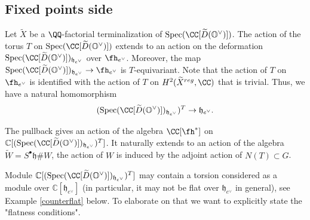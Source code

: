 \documentclass[12pt]{amsart}
\begin{document}





\subsection{Fixed points side}\label{fixed points subsection}
Let $\widetilde{X}$ be a $\QQ$-factorial terminalization of $\operatorname{Spec}(\CC[\widetilde{D}(\mathbb{O}^\vee)])$. The action of the torus $T$ on $\operatorname{Spec}(\CC[\widetilde{D}(\mathbb{O}^\vee)])$ extends to an action on the deformation $\operatorname{Spec}(\CC[\widetilde{D}(\mathbb{O}^\vee)])_{\mathfrak{h}_{e^\vee}}$ over $\fh_{e^\vee}$. Moreover, the map $\operatorname{Spec}(\CC[\widetilde{D}(\mathbb{O}^\vee)])_{\mathfrak{h}_{e^\vee}}\to \fh_{e^\vee}$ is $T$-equivariant. Note that the action of $T$ on $\fh_{e^\vee}$ is identified with the action of $T$ on $H^2(\widetilde{X}^{reg}, \CC)$ that is trivial. Thus, we have a natural homomorphism \begin{equation*}
(\operatorname{Spec}(\CC[\widetilde{D}(\mathbb{O}^\vee)])_{\mathfrak{h}_{e^\vee}})^{T} \rightarrow \mathfrak{h}_{e^\vee}.
\end{equation*}

The pullback gives an action of the algebra $\CC[\fh^*]$ on $\mathbb{C}[(\operatorname{Spec}(\CC[\widetilde{D}(\mathbb{O}^\vee)])_{\mathfrak{h}_{e^\vee}})^{T}]$. It naturally extends to an action of the algebra $\widetilde{W}=S^\bullet\mathfrak{h} \# W$, the action of $W$ is induced by the adjoint action of $N(T) \subset G$.


Module $\mathbb{C}[(\operatorname{Spec}(\CC[\widetilde{D}(\mathbb{O}^\vee)])_{\mathfrak{h}_{e^\vee}})^{T}]$ may contain a torsion considered as a module over $\mathbb{C}[\mathfrak{h}_{e^\vee}]$ (in particular, it may not be flat over $\mathfrak{h}_{e^\vee}$ in general), see Example \ref{counterflat} below. To elaborate on that we want to explicitly state the "flatness conditions". 
\end{document}
